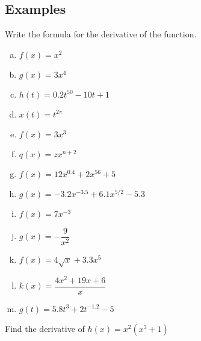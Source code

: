 \documentclass[notes]{subfiles}
\begin{document}
	\subsection*{Examples}
		\begin{ex} Write the formula for the derivative of the function.
			\begin{enumerate}[(a)] 
				\item $f(x) = x^2$ 
					
				\item $g(x) = 3x^4$
					
				\item $h(t) = 0.2t^{50}-10t + 1$
					
				\item $x(t) = t^{2\pi}$  
					
  				\item $f(x) = 3x^3$  
  					\newpage
  					
  				\item $q(x) = z x^{n+2}$  
  					
				\item $f(x) = 12x^{0.4} + 2x^{56} + 5$  
					
				\item $g(x) = -3.2x^{-3.5} + 6.1x^{5/2} - 5.3$  
					
				\item $f(x) = 7x^{-3}$ 
					
				\item $g(x) = -\dfrac{9}{x^2}$ 
					\newpage
					
				\item $f(x) = 4\sqrt{x} + 3.3x^5$ 
					
				\item $k(x) = \dfrac{4x^2+19x+6}{x}$  
					
				\item $g(t) = 5.8t^3 + 2t^{-1.2} - 5$ 
			\end{enumerate}
 		\end{ex}
 		
 		\begin{ex}
 			Find the derivative of $h(x) = x^2(x^3 + 1)$
 		\end{ex}
 			\newpage
 			
\end{document}
